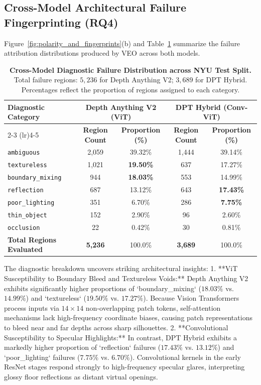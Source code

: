 \documentclass[11pt,a4paper]{article}
\begin{document}
\subsection{Cross-Model Architectural Failure Fingerprinting (RQ4)}
Figure~\ref{fig:polarity_and_fingerprints}(b) and Table~\ref{tab:cause_distribution} summarize the failure attribution distributions produced by VEO across both models.

\begin{table}[h]
\caption{\textbf{Cross-Model Diagnostic Failure Distribution across NYU Test Split.} Total failure regions: $5,236$ for Depth Anything V2; $3,689$ for DPT Hybrid. Percentages reflect the proportion of regions assigned to each category.}
\label{tab:cause_distribution}
\centering
\small
\begin{tabular}{@{}lcccc@{}}
\toprule
\multirow{2}{*}{\textbf{Diagnostic Category}} & \multicolumn{2}{c}{\textbf{Depth Anything V2 (ViT)}} & \multicolumn{2}{c}{\textbf{DPT Hybrid (Conv-ViT)}} \\
\cmidrule(lr){2-3} \cmidrule(lr){4-5}
& \textbf{Region Count} & \textbf{Proportion (\%)} & \textbf{Region Count} & \textbf{Proportion (\%)} \\
\midrule
\texttt{ambiguous} & 2,059 & 39.32\% & 1,444 & 39.14\% \\
\texttt{textureless} & 1,021 & \textbf{19.50\%} & 637 & 17.27\% \\
\texttt{boundary\_mixing} & 944 & \textbf{18.03\%} & 553 & 14.99\% \\
\texttt{reflection} & 687 & 13.12\% & 643 & \textbf{17.43\%} \\
\texttt{poor\_lighting} & 351 & 6.70\% & 286 & \textbf{7.75\%} \\
\texttt{thin\_object} & 152 & 2.90\% & 96 & 2.60\% \\
\texttt{occlusion} & 22 & 0.42\% & 30 & 0.81\% \\
\midrule
\textbf{Total Regions Evaluated} & \textbf{5,236} & 100.0\% & \textbf{3,689} & 100.0\% \\
\bottomrule
\end{tabular}
\end{table}

The diagnostic breakdown uncovers striking architectural insights:
1. **ViT Susceptibility to Boundary Bleed and Textureless Voids:** Depth Anything V2 exhibits significantly higher proportions of `boundary_mixing` ($18.03\%$ vs. $14.99\%$) and `textureless` ($19.50\%$ vs. $17.27\%$). Because Vision Transformers process inputs via $14 \times 14$ non-overlapping patch tokens, self-attention mechanisms lack high-frequency coordinate biases, causing patch representations to bleed near and far depths across sharp silhouettes.
2. **Convolutional Susceptibility to Specular Highlights:** In contrast, DPT Hybrid exhibits a markedly higher proportion of `reflection` failures ($17.43\%$ vs. $13.12\%$) and `poor_lighting` failures ($7.75\%$ vs. $6.70\%$). Convolutional kernels in the early ResNet stages respond strongly to high-frequency specular glares, interpreting glossy floor reflections as distant virtual openings.
\end{document}
